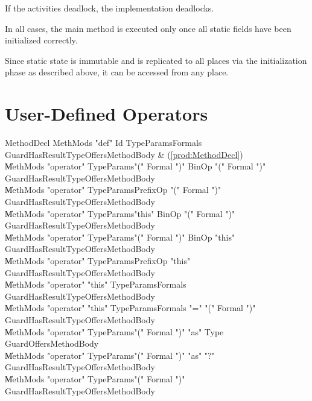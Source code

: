 If the activities deadlock, the implementation deadlocks.

In all cases, the main method is executed only once all static fields
have been initialized correctly.

Since static state is immutable and is replicated to all places via 
the initialization phase as described above, it can be accessed from
any place.



\section{User-Defined Operators}
\label{sect:operators}

\begin{bbgrammar}
          MethodDecl \: MethMods \xcd"def" Id TypeParams\opt Formals Guard\opt HasResultType\opt Offers\opt MethodBody & (\ref{prod:MethodDecl}) \\
                     \| MethMods \xcd"operator" TypeParams\opt \xcd"(" Formal  \xcd")" BinOp \xcd"(" Formal  \xcd")" Guard\opt HasResultType\opt Offers\opt MethodBody \\
                     \| MethMods \xcd"operator" TypeParams\opt PrefixOp \xcd"(" Formal  \xcd")" Guard\opt HasResultType\opt Offers\opt MethodBody \\
                     \| MethMods \xcd"operator" TypeParams\opt \xcd"this" BinOp \xcd"(" Formal  \xcd")" Guard\opt HasResultType\opt Offers\opt MethodBody \\
                     \| MethMods \xcd"operator" TypeParams\opt \xcd"(" Formal  \xcd")" BinOp \xcd"this" Guard\opt HasResultType\opt Offers\opt MethodBody \\
                     \| MethMods \xcd"operator" TypeParams\opt PrefixOp \xcd"this" Guard\opt HasResultType\opt Offers\opt MethodBody \\
                     \| MethMods \xcd"operator" \xcd"this" TypeParams\opt Formals Guard\opt HasResultType\opt Offers\opt MethodBody \\
                     \| MethMods \xcd"operator" \xcd"this" TypeParams\opt Formals \xcd"=" \xcd"(" Formal  \xcd")" Guard\opt HasResultType\opt Offers\opt MethodBody \\
                     \| MethMods \xcd"operator" TypeParams\opt \xcd"(" Formal  \xcd")" \xcd"as" Type Guard\opt Offers\opt MethodBody \\
                     \| MethMods \xcd"operator" TypeParams\opt \xcd"(" Formal  \xcd")" \xcd"as" \xcd"?" Guard\opt HasResultType\opt Offers\opt MethodBody \\
                     \| MethMods \xcd"operator" TypeParams\opt \xcd"(" Formal  \xcd")" Guard\opt HasResultType\opt Offers\opt MethodBody \\
\end{bbgrammar}


